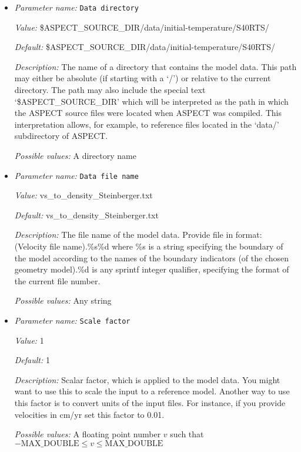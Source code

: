 \begin{itemize}
\item {\it Parameter name:} {\tt Data directory}
\label{parameters:Initial temperature model/S40RTS perturbation/Ascii data vs to density model/Data directory}


{\it Value:} \$ASPECT\_SOURCE\_DIR/data/initial-temperature/S40RTS/


{\it Default:} \$ASPECT\_SOURCE\_DIR/data/initial-temperature/S40RTS/


{\it Description:} The name of a directory that contains the model data. This path may either be absolute (if starting with a `/') or relative to the current directory. The path may also include the special text `\$ASPECT\_SOURCE\_DIR' which will be interpreted as the path in which the ASPECT source files were located when ASPECT was compiled. This interpretation allows, for example, to reference files located in the `data/' subdirectory of ASPECT. 


{\it Possible values:} A directory name
\item {\it Parameter name:} {\tt Data file name}
\label{parameters:Initial temperature model/S40RTS perturbation/Ascii data vs to density model/Data file name}


{\it Value:} vs\_to\_density\_Steinberger.txt


{\it Default:} vs\_to\_density\_Steinberger.txt


{\it Description:} The file name of the model data. Provide file in format: (Velocity file name).\%s\%d where \%s is a string specifying the boundary of the model according to the names of the boundary indicators (of the chosen geometry model).\%d is any sprintf integer qualifier, specifying the format of the current file number. 


{\it Possible values:} Any string
\item {\it Parameter name:} {\tt Scale factor}
\label{parameters:Initial temperature model/S40RTS perturbation/Ascii data vs to density model/Scale factor}


{\it Value:} 1


{\it Default:} 1


{\it Description:} Scalar factor, which is applied to the model data. You might want to use this to scale the input to a reference model. Another way to use this factor is to convert units of the input files. For instance, if you provide velocities in cm/yr set this factor to 0.01.


{\it Possible values:} A floating point number $v$ such that $-\text{MAX\_DOUBLE} \leq v \leq \text{MAX\_DOUBLE}$
\end{itemize}

